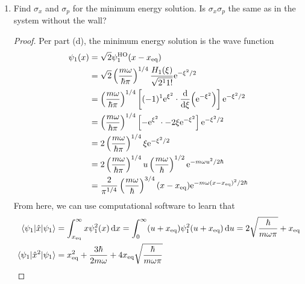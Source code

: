 \documentclass[../psets.tex]{subfiles}
\begin{document}
\begin{enumerate}
\begin{enumerate}
        \begin{proof}
            The minimal energy is now that which corresponds to the new smallest eigenstate, i.e.,
            \begin{equation*}
                \boxed{E_1 = \frac{3\hbar\omega}{2}+C}
            \end{equation*}
            This is  the same as the system without the floor, which had minimal energy $\hbar\omega/2+C$. The corresponding eigenfunction is 
        \end{proof}
        \item Find $\sigma_x$ and $\sigma_p$ for the minimum energy solution. Is $\sigma_x\sigma_p$ the same as in the system without the wall?
        \begin{proof}
            Per part (d), the minimum energy solution is the wave function
            \begin{align*}
                \psi_1(x) &= \sqrt{2}\psi_1^\text{HO}(x-x_\text{eq})\\
                &= \sqrt{2}\left( \frac{m\omega}{\hbar\pi} \right)^{1/4}\frac{H_1(\xi)}{\sqrt{2^11!}}\e[-\xi^2/2]\\
                &= \left( \frac{m\omega}{\hbar\pi} \right)^{1/4}\left[ (-1)^1\e[\xi^2]\cdot\dv{\xi}(\e[-\xi^2]) \right]\e[-\xi^2/2]\\
                &= \left( \frac{m\omega}{\hbar\pi} \right)^{1/4}\left[ -\e[\xi^2]\cdot -2\xi\e[-\xi^2] \right]\e[-\xi^2/2]\\
                &= 2\left( \frac{m\omega}{\hbar\pi} \right)^{1/4}\xi\e[-\xi^2/2]\\
                &= 2\left( \frac{m\omega}{\hbar\pi} \right)^{1/4}u\left( \frac{m\omega}{\hbar} \right)^{1/2}\e[-m\omega u^2/2\hbar]\\
                &= \frac{2}{\pi^{1/4}}\left( \frac{m\omega}{\hbar} \right)^{3/4}(x-x_\text{eq})\e[-m\omega(x-x_\text{eq})^2/2\hbar]
            \end{align*}
            From here, we can use computational software to learn that
            \begin{align*}
                \ev{\hat{x}}{\psi_1} &= \int_{x_\text{eq}}^\infty x\psi_1^2(x)\dd{x}
                    = \int_0^\infty (u+x_\text{eq})\psi_1^2(u+x_\text{eq})\dd{u}
                    = 2\sqrt{\frac{\hbar}{m\omega\pi}}+x_\text{eq}\\
                \ev{\hat{x}^2}{\psi_1} &= x_\text{eq}^2+\frac{3\hbar}{2m\omega}+4x_\text{eq}\sqrt{\frac{\hbar}{m\omega\pi}}\\

\end{align*}
\end{proof}
\end{enumerate}
\end{enumerate}
\end{document}
